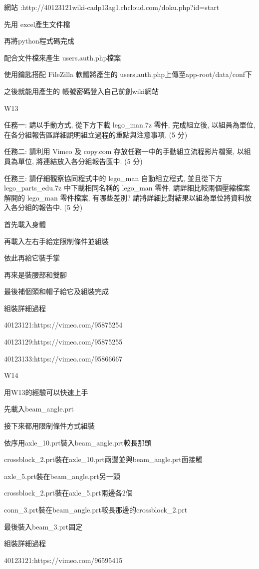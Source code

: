 \documentclass[]{article}
\begin{document}
網站 :http://40123121wiki-cadp13ag1.rhcloud.com/doku.php?id=start

先用 excel產生文件檔

再將python程式碼完成

配合文件檔來產生 users.auth.php檔案

使用鑰匙搭配 FileZilla 軟體將產生的
users.auth.php上傳至app-root/data/conf下

之後就能用產生的 帳號密碼登入自己前創wiki網站

W13

任務一: 請以手動方式, 從下方下載 lego\_man.7z 零件, 完成組立後,
以組員為單位, 在各分組報告區詳細說明組立過程的重點與注意事項. (5 分)

任務二: 請利用 Vimeo 及 copy.com 存放任務一中的手動組立流程影片檔案,
以組員為單位, 將連結放入各分組報告區中. (5 分)

任務三: 請仔細觀察協同程式中的 lego\_man 自動組立程式, 並且從下方
lego\_parts\_edu.7z 中下載相同名稱的 lego\_man 零件,
請詳細比較兩個壓縮檔案解開的 lego\_man 零件檔案, 有哪些差別?
請將詳細比對結果以組為單位將資料放入各分組的報告中. (5 分)

首先載入身體

再載入左右手給定限制條件並組裝

依此再給它裝手掌

再來是裝腰部和雙腳

最後補個頭和帽子給它及組裝完成

組裝詳細過程

40123121:https://vimeo.com/95875254

40123129:https://vimeo.com/95875255

40123133:https://vimeo.com/95866667

W14

用W13的經驗可以快速上手

先載入beam\_angle.prt

接下來都用限制條件方式組裝

依序用axle\_10.prt裝入beam\_angle.prt較長那頭

crossblock\_2.prt裝在axle\_10.prt兩邊並與beam\_angle.prt面接觸

axle\_5.prt裝在beam\_angle.prt另一頭

crossblock\_2.prt裝在axle\_5.prt兩邊各2個

conn\_3.prt裝在beam\_angle.prt較長那邊的crossblock\_2.prt

最後裝入beam\_3.prt固定

組裝詳細過程

40123121:https://vimeo.com/96595415
\end{document}
